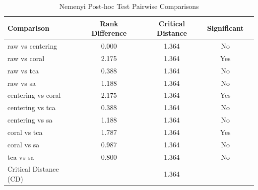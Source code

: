 \begin{table}[htbp]
\centering
\caption{Nemenyi Post-hoc Test Pairwise Comparisons}
\label{tab:nemenyi}
\begin{tabular}{lcccc}
\toprule
Comparison & Rank Difference & Critical Distance & Significant \\
\midrule
raw vs centering & 0.000 & 1.364 & No \\
raw vs coral & 2.175 & 1.364 & Yes \\
raw vs tca & 0.388 & 1.364 & No \\
raw vs sa & 1.188 & 1.364 & No \\
centering vs coral & 2.175 & 1.364 & Yes \\
centering vs tca & 0.388 & 1.364 & No \\
centering vs sa & 1.188 & 1.364 & No \\
coral vs tca & 1.787 & 1.364 & Yes \\
coral vs sa & 0.987 & 1.364 & No \\
tca vs sa & 0.800 & 1.364 & No \\
\midrule
Critical Distance (CD) & & 1.364 & \\
\bottomrule
\end{tabular}
\end{table}